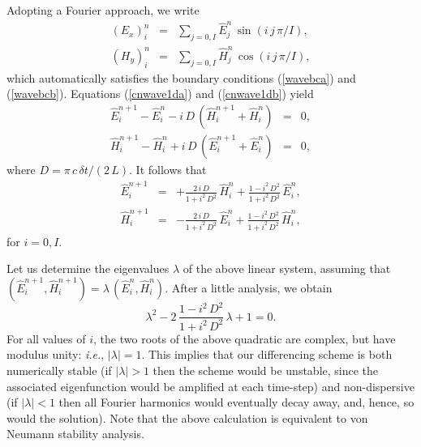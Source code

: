 Adopting a Fourier approach, we write
\begin{eqnarray}
(E_x)_i^n &=& \sum_{j=0,I} \hat{E}_j^n\,\sin(i\,j\,\pi/I),\\[0.5ex]
(H_y)_i^n &=& \sum_{j=0,I} \hat{H}_j^n\,\cos(i\,j\,\pi/I),
\end{eqnarray}
which automatically satisfies the boundary conditions (\ref{wavebca}) and (\ref{wavebcb}). 
Equations (\ref{cnwave1da}) and (\ref{cnwave1db}) yield
\begin{eqnarray}
\hat{E}_i^{n+1}-\hat{E}_i^n - i\,D\,(\hat{H}_i^{n+1}+\hat{H}_i^n) &=& 0,\\[0.5ex]
\hat{H}_i^{n+1}-\hat{H}_i^n +  i\,D\,(\hat{E}_i^{n+1}+\hat{E}_i^n) &=& 0,
\end{eqnarray}
where $D=\pi\,c\,\delta t/(2\,L)$. It follows that
\begin{eqnarray}\label{stepa}
\hat{E}_i^{n+1} &=& +\frac{2\,i\,D}{1+i^2\,D^2}\,\hat{H}_i^n + \frac{1-i^2\,D^2}{1+i^2\,D^2}\,\hat{E}_i^n,\\[0.5ex]
\hat{H}_i^{n+1} &=& -\frac{2\,i\,D}{1+i^2\,D^2}\,\hat{E}_i^n + \frac{1-i^2\,D^2}{1+i^2\,D^2}\,\hat{H}_i^n,
\label{stepb}
\end{eqnarray}
for $i=0,I$. 

Let us determine the eigenvalues $\lambda$ of the above linear system,
assuming that $(\hat{E}_i^{n+1}, \hat{H}_i^{n+1}) = \lambda\,(\hat{E}_i^n, \hat{H}_i^n)$. After a little analysis,
we obtain
\begin{equation}
\lambda^2 - 2\,\frac{1-i^2\,D^2}{1+i^2\,D^2}\,\lambda + 1 = 0.
\end{equation}
For all values of $i$, the two roots of the above quadratic are complex, but have modulus unity: {\em i.e.},
$|\lambda|=1$. This implies that our differencing scheme is both
numerically stable (if $|\lambda|>1$ then the scheme would be unstable, since the associated
eigenfunction would be amplified at each time-step)
and non-dispersive (if $|\lambda|<1$ then all Fourier harmonics would eventually
decay away, and, hence, so would the solution). Note that the above calculation is
equivalent to von Neumann stability analysis.

